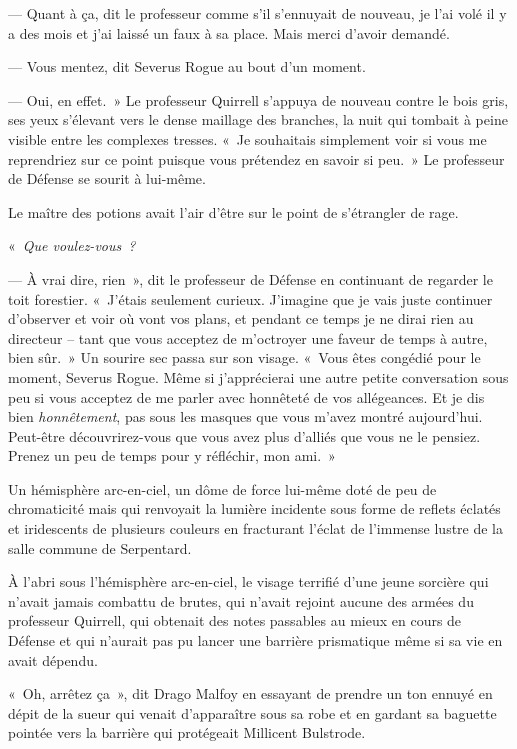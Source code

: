 --- Quant à ça, dit le professeur comme s'il s'ennuyait de nouveau, je l'ai volé il y a des mois et j'ai laissé un faux à sa place. Mais merci d'avoir demandé.

--- Vous mentez, dit Severus Rogue au bout d'un moment.

--- Oui, en effet.~» Le professeur Quirrell s'appuya de nouveau contre le bois gris, ses yeux s'élevant vers le dense maillage des branches, la nuit qui tombait à peine visible entre les complexes tresses. «~Je souhaitais simplement voir si vous me reprendriez sur ce point puisque vous prétendez en savoir si peu.~» Le professeur de Défense se sourit à lui-même.

Le maître des potions avait l'air d'être sur le point de s'étrangler de rage.

«~\emph{Que voulez-vous~?}

--- À vrai dire, rien~», dit le professeur de Défense en continuant de regarder le toit forestier. «~J'étais seulement curieux. J'imagine que je vais juste continuer d'observer et voir où vont vos plans, et pendant ce temps je ne dirai rien au directeur -- tant que vous acceptez de m'octroyer une faveur de temps à autre, bien sûr.~» Un sourire sec passa sur son visage. «~Vous êtes congédié pour le moment, Severus Rogue. Même si j'apprécierai une autre petite conversation sous peu si vous acceptez de me parler avec honnêteté de vos allégeances. Et je dis bien \emph{honnêtement}, pas sous les masques que vous m'avez montré aujourd'hui. Peut-être découvrirez-vous que vous avez plus d'alliés que vous ne le pensiez. Prenez un peu de temps pour y réfléchir, mon ami.~»


Un hémisphère arc-en-ciel, un dôme de force lui-même doté de peu de chromaticité mais qui renvoyait la lumière incidente sous forme de reflets éclatés et iridescents de plusieurs couleurs en fracturant l'éclat de l'immense lustre de la salle commune de Serpentard.

À l'abri sous l'hémisphère arc-en-ciel, le visage terrifié d'une jeune sorcière qui n'avait jamais combattu de brutes, qui n'avait rejoint aucune des armées du professeur Quirrell, qui obtenait des notes passables au mieux en cours de Défense et qui n'aurait pas pu lancer une barrière prismatique même si sa vie en avait dépendu.

«~Oh, arrêtez ça~», dit Drago Malfoy en essayant de prendre un ton ennuyé en dépit de la sueur qui venait d'apparaître sous sa robe et en gardant sa baguette pointée vers la barrière qui protégeait Millicent Bulstrode.

